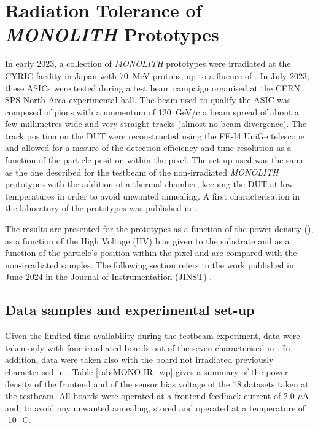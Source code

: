 	\clearpage
	\section{Radiation Tolerance of \textit{MONOLITH} Prototypes}
	In early 2023, a collection of \textit{MONOLITH} prototypes were irradiated at the CYRIC facility \cite{CYRIC_facility} in Japan with \SI{70}{\mega\electronvolt} protons, up to a fluence of \maxflu. In July 2023, these ASICs were tested during a test beam campaign organised at the CERN SPS North Area experimental hall. The beam used to qualify the ASIC was composed of pions with a momentum of \SI{120}{\giga\electronvolt}/c a beam spread of about a few millimetres wide and very straight tracks (almost no beam divergence). The track position on the DUT were reconstructed using the FE-I4 UniGe telescope \cite{telescope} and allowed for a mesure of the detection efficiency and time resolution as a function of the particle position within the pixel. The set-up used was the same as the one described for the testbeam of the non-irradiated \textit{MONOLITH} prototypes with the addition of a thermal chamber, keeping the DUT at low temperatures in order to avoid unwanted annealing. A first characterisation in the laboratory of the prototypes was published in \cite{LabRad_Mono2023}.
		
	The results are presented for the prototypes as a function of the power density (\power), as a function of the High Voltage (HV) bias given to the substrate and as a function of the particle's position within the pixel and are compared with the non-irradiated samples. The following section refers to the work published in June 2024 in the Journal of Instrumentation (JINST) \cite{Moretti_irradiated}.

		\subsection{Data samples and experimental set-up}
		Given the limited time availability during the testbeam experiment, data were taken only with four irradiated boards out of the seven characterised in \cite{LabRad_Mono2023}. 
		In addition, data were taken also with the board not irradiated previously characterised in \cite{Monolith_20ps}.
		Table \ref{tab:MONO-IR_wp} gives a summary of the power density of the frontend and of the sensor bias voltage of the 18 datasets taken at the testbeam. All boards were operated at a frontend feedback current of 2.0 $\mu$A and, to avoid any unwanted annealing, stored and operated at a temperature of -10 $^\circ$C. 


